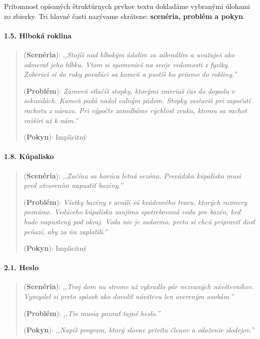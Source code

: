 Prítomnosť opísaných štruktúrnych prvkov textu dokladáme vybranými úlohami zo zbierky. Tri hlavné časti nazývame skrátene: \textbf{scenéria, problém a pokyn}.

\paragraph{1.5. Hlboká roklina}
\begin{quote}
(\textbf{Scenéria}): \textit{\small ,,Stojíš nad hlbokým údolím za zábradlím a uvažuješ ako odmerať jeho hĺbku. Vtom si spomenieš na svoje vedomosti z fyziky. Zoberieš si do ruky povaľúci sa kameň a pustíš ho priamo do rokliny.''}

(\textbf{Problém}):  \textit{\small Zároveň stlačíš stopky, ktorými zmeriaš čas do dopadu v sekundách. Kameň padá nadol voľným pádom. Stopky zastaviš pri započutí rachotu z nárazu. 
Pri výpočte zanedbáme rýchlosť zvuku, ktorou sa rachot rožšíri až k nám.''}

(\textbf{Pokyn}): Implicitný
\end{quote}

\paragraph{1.8. Kúpalisko}
\begin{quote}
(\textbf{Scenéria}): \textit{\small ,,Začína sa horúca letná sezóna. Prevádzka kúpaliska musí pred otvorením napustiť bazény.''}

(\textbf{Problém}):  \textit{\small Všetky bazény v areáli sú kvádrového tvaru, ktorých rozmery poznáme. Vedúceho kúpaliska zaujíma spotrebovaná voda pre bazén, keď bude napustený pod okraj. Voda nie je zadarmo, preto si chcú pripraviť dosť peňazí, aby za ňu zaplatili.''}

(\textbf{Pokyn}): Implicitný
\end{quote}

\paragraph{2.1. Heslo}
\begin{quote}
(\textbf{Scenéria}): \textit{\small ,,Tvoj dom na strome už vykradlo pár nezvaných návštevníkov. Vymyslel si preto spôsob ako dovoliť návštevu len overeným osobám.''}

(\textbf{Problém}): \textit{\small ,,Tie musia poznať tajné heslo.''}

(\textbf{Pokyn}): \textit{\small ,,Napíš program, ktorý slovne privíta členov a odoženie zlodejov.''}
\end{quote}

